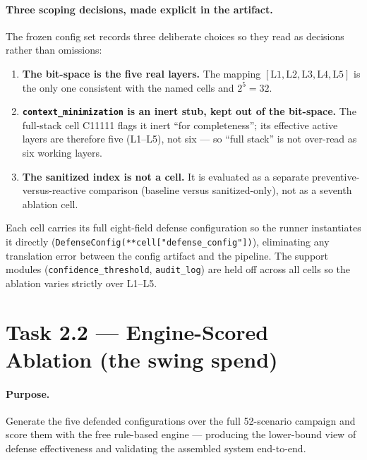 \documentclass[11pt,a4paper]{article}
\newcommand{\code}[1]{\texttt{\small #1}}
\begin{document}
\paragraph{Three scoping decisions, made explicit in the artifact.} The frozen config set records three deliberate choices so they read as decisions rather than omissions:
\begin{enumerate}[leftmargin=1.3cm]
\item \textbf{The bit-space is the five real layers.} The mapping $[\text{L1},\text{L2},\text{L3},\text{L4},\text{L5}]$ is the only one consistent with the named cells and $2^5=32$.
\item \textbf{\code{context\_minimization} is an inert stub, kept out of the bit-space.} The full-stack cell C11111 flags it inert ``for completeness''; its effective active layers are therefore five (L1--L5), not six --- so ``full stack'' is not over-read as six working layers.
\item \textbf{The sanitized index is not a cell.} It is evaluated as a separate preventive-versus-reactive comparison (baseline versus sanitized-only), not as a seventh ablation cell.
\end{enumerate}
Each cell carries its full eight-field defense configuration so the runner instantiates it directly (\code{DefenseConfig(**cell["defense\_config"])}), eliminating any translation error between the config artifact and the pipeline. The support modules (\code{confidence\_threshold}, \code{audit\_log}) are held off across all cells so the ablation varies strictly over L1--L5.

\section{Task 2.2 --- Engine-Scored Ablation (the swing spend)}
\label{sec:engine}

\paragraph{Purpose.} Generate the five defended configurations over the full 52-scenario campaign and score them with the free rule-based engine --- producing the lower-bound view of defense effectiveness and validating the assembled system end-to-end.
\end{document}
